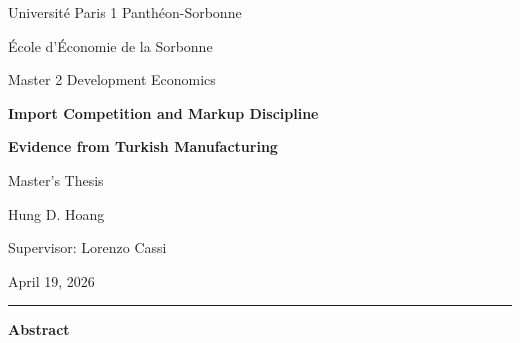 \documentclass[12pt]{article}
\begin{document}
\begin{titlepage}
\thispagestyle{empty}
\begin{center}
\vspace*{0.45cm}
{\large Universit\'{e} Paris 1 Panth\'{e}on-Sorbonne\par}
\vspace{0.08cm}
{\normalsize \'{E}cole d'\'{E}conomie de la Sorbonne\par}
\vspace{0.08cm}
{\normalsize Master 2 Development Economics\par}

\vspace{0.95cm}

{\Large\bfseries Import Competition and Markup Discipline\par}
\vspace{0.18cm}
{\large\bfseries Evidence from Turkish Manufacturing\par}

\vspace{0.85cm}

{\normalsize Master's Thesis\par}
\vspace{0.32cm}
{\large Hung D. Hoang\par}

\vspace{0.2cm}

{\normalsize Supervisor: Lorenzo Cassi\par}

\vspace{0.38cm}

{\normalsize April 19, 2026\par}
\end{center}

\vspace{0.45cm}
\noindent\rule{\textwidth}{0.5pt}

\begingroup
{}
\footnotesize
\begin{center}
\begin{minipage}{0.94\textwidth}
\textbf{Abstract}

\smallskip


\end{minipage}
\end{center}
\end{titlepage}
\end{document}
